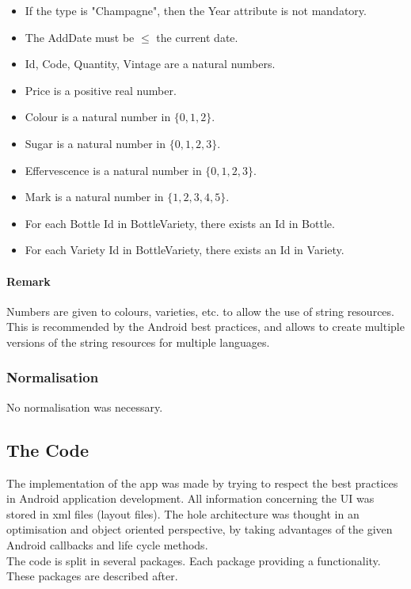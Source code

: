 \begin{itemize}
	\item If the type is "Champagne", then the Year attribute is not mandatory.
	\item The AddDate must be $\leq$ the current date.
	\item Id, Code, Quantity, Vintage are a natural numbers.
	\item Price is a positive real number.
	\item Colour is a natural number in $\{ 0, 1, 2\}$.
	\item Sugar is a natural number in $\{0, 1, 2, 3\}$.
	\item Effervescence is a natural number in $\{0, 1, 2, 3\}$.
	\item Mark is a natural number in $\{1, 2, 3, 4, 5\}$.
	\item For each Bottle Id in BottleVariety, there exists an Id in Bottle.
	\item For each Variety Id in BottleVariety, there exists an Id in Variety.
\end{itemize}

\paragraph{Remark}
Numbers are given to colours, varieties, etc. to allow the use of string resources. This is recommended by the Android best practices, and allows to create multiple versions of the string resources for multiple languages.

\subsubsection{Normalisation}

No normalisation was necessary.

\subsection{The Code}

The implementation of the app was made by trying to respect the best practices in Android application development. All information concerning the UI was stored in xml files (layout files). The hole architecture was thought in an optimisation and object oriented perspective, by taking advantages of the given Android callbacks and life cycle methods.\\

The code is split in several packages. Each package providing a functionality. These packages are described after.

